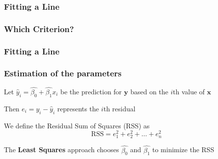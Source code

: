 \documentclass[12pt]{beamer}\usepackage[]{graphicx}\usepackage[]{color}
\begin{document}

\begin{frame}
\frametitle{Fitting a Line}
\begin{center}
\end{center}
\end{frame}


\begin{frame}
\frametitle{Which Criterion?}
\begin{center}
\end{center}
\end{frame}


\begin{frame}
\frametitle{Fitting a Line}
\begin{center}
\end{center}
\end{frame}


\begin{frame}
\begin{center}
\Huge{}
\end{center}
\end{frame}


\begin{frame}
\frametitle{Estimation of the parameters}

\bi
  \item Let $\hat{y}_i = \hat{\beta_0} + \hat{\beta_1} x_i$ be the prediction
  for $\mathbf{y}$ based on the $i$th value of $\mathbf{x}$
  \pause
  \item Then $e_i = y_i - \hat{y}_i$ represents the $i$th {\hilit residual} 
  \pause
  \item We define the {\hilit Residual Sum of Squares} (RSS) as
  $$
  \text{RSS} = e_1^2 + e_2^2 + \dots + e_n^2
  $$
  \item The \textbf{Least Squares} approach chooses $\hat{\beta_0}$ and 
$\hat{\beta_1}$ to minimize the RSS
\ei

\end{frame}
\end{document}
